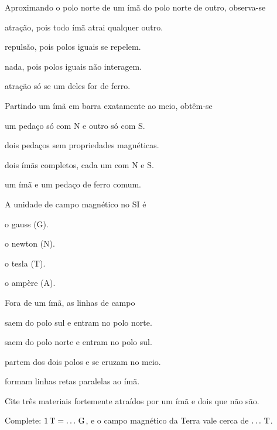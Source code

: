 \documentclass{notaaula}
\begin{document}
\begin{exercicios}
\begin{questoes}
\item Aproximando o polo norte de um ímã do polo norte de outro, observa-se
  \begin{alternativas}
  \item atração, pois todo ímã atrai qualquer outro.
  \item repulsão, pois polos iguais se repelem.
  \item nada, pois polos iguais não interagem.
  \item atração só se um deles for de ferro.
  \end{alternativas}
\item Partindo um ímã em barra exatamente ao meio, obtêm-se
  \begin{alternativas}
  \item um pedaço só com N e outro só com S.
  \item dois pedaços sem propriedades magnéticas.
  \item dois ímãs completos, cada um com N e S.
  \item um ímã e um pedaço de ferro comum.
  \end{alternativas}
\item A unidade de campo magnético no SI é
  \begin{alternativas}
  \item o gauss (G).
  \item o newton (N).
  \item o tesla (T).
  \item o ampère (A).
  \end{alternativas}
\item Fora de um ímã, as linhas de campo
  \begin{alternativas}
  \item saem do polo sul e entram no polo norte.
  \item saem do polo norte e entram no polo sul.
  \item partem dos dois polos e se cruzam no meio.
  \item formam linhas retas paralelas ao ímã.
  \end{alternativas}
\item Cite três materiais fortemente atraídos por um ímã e dois que não são.
\item Complete: $1\,\mathrm{T} = \ldots\,\mathrm{G}$, e o campo magnético da Terra vale
      cerca de $\ldots\,\mathrm{T}$.
\end{questoes}


\end{exercicios}
\end{document}
